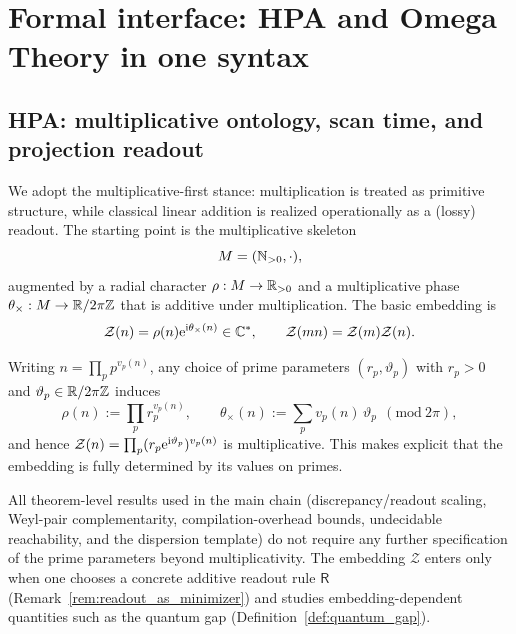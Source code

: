 \section{Formal interface: HPA and Omega Theory in one syntax}
\label{sec:interface}

\subsection{HPA: multiplicative ontology, scan time, and projection readout}
\label{subsec:hpa_basics}
We adopt the multiplicative-first stance: multiplication is treated as primitive structure, while classical linear addition is realized operationally as a (lossy) readout.
The starting point is the multiplicative skeleton
\begin{equation}
M=(\mathbb{N}_{>0},\cdot),
\end{equation}
augmented by a radial character $\rho:M\to\mathbb{R}_{>0}$ and a multiplicative phase $\theta_\times:M\to\mathbb{R}/2\pi\mathbb{Z}$ that is additive under multiplication. The basic embedding is
\begin{equation}
\mathcal{Z}(n)=\rho(n)\mathrm{e}^{\mathrm{i}\theta_\times(n)}\in\mathbb{C}^*,\qquad \mathcal{Z}(mn)=\mathcal{Z}(m)\mathcal{Z}(n).
\label{eq:polar_embedding}
\end{equation}

\begin{remark}
\label{rem:prime_parametrization}
Writing $n=\prod_p p^{v_p(n)}$, any choice of prime parameters $(r_p,\vartheta_p)$ with $r_p>0$ and $\vartheta_p\in\mathbb{R}/2\pi\mathbb{Z}$ induces
\begin{equation}
\rho(n):=\prod_p r_p^{v_p(n)},\qquad
\theta_\times(n):=\sum_p v_p(n)\,\vartheta_p\ \ (\mathrm{mod}\ 2\pi),
\end{equation}
and hence $\mathcal{Z}(n)=\prod_p (r_p\mathrm{e}^{\mathrm{i}\vartheta_p})^{v_p(n)}$ is multiplicative.
This makes explicit that the embedding is fully determined by its values on primes.
\end{remark}

\begin{remark}
\label{rem:what_depends_on_Z}
All theorem-level results used in the main chain (discrepancy/readout scaling, Weyl-pair complementarity, compilation-overhead bounds, undecidable reachability, and the dispersion template) do not require any further specification of the prime parameters beyond multiplicativity.
The embedding $\mathcal{Z}$ enters only when one chooses a concrete additive readout rule $\mathsf{R}$ (Remark~\ref{rem:readout_as_minimizer}) and studies embedding-dependent quantities such as the quantum gap (Definition~\ref{def:quantum_gap}).
\end{remark}


